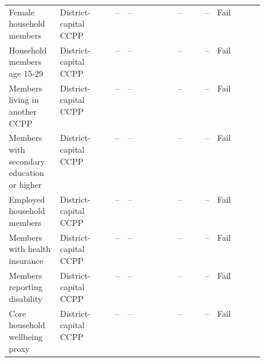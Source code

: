 \begin{longtable}{@{}p{0.20\linewidth}p{0.16\linewidth}rp{0.14\linewidth}rrl@{}}
Female household members & District-capital CCPP & -- & -- & -- & -- & Fail \\
Household members age 15-29 & District-capital CCPP & -- & -- & -- & -- & Fail \\
Members living in another CCPP & District-capital CCPP & -- & -- & -- & -- & Fail \\
Members with secondary education or higher & District-capital CCPP & -- & -- & -- & -- & Fail \\
Employed household members & District-capital CCPP & -- & -- & -- & -- & Fail \\
Members with health insurance & District-capital CCPP & -- & -- & -- & -- & Fail \\
Members reporting disability & District-capital CCPP & -- & -- & -- & -- & Fail \\
Core household wellbeing proxy & District-capital CCPP & -- & -- & -- & -- & Fail \\
\end{longtable}
\endgroup
